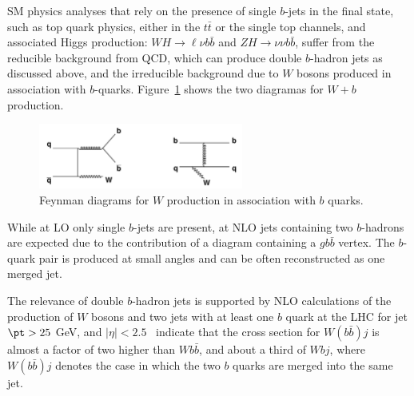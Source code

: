 SM physics analyses that rely on the presence of single $b$-jets in the final state, such as top quark physics, either in the $t\bar{t}$ or the single top channels, and associated Higgs production: $WH\rightarrow\ell\nu b\bar{b}$ and $ZH\rightarrow\nu\nu b\bar{b}$,  suffer from  %
the reducible background from QCD, which can produce double $b$-hadron jets as discussed above, and the irreducible background due to $W$ bosons produced in association with $b$-quarks.
Figure~\ref{fig:Wplusb} shows the two diagramas %
for $W+b$ production. %

\begin{figure}[htbp]
  \begin{center}
      \includegraphics[width=0.6\textwidth]{FIGS/Wbb_diagram.jpg}
    \caption{Feynman diagrams for $W$ production in association with $b$ quarks.}
    \label{fig:Wplusb}
  \end{center}
\end{figure}

While at LO only single $b$-jets are present, at NLO jets containing two $b$-hadrons are expected due to the contribution of a diagram containing a $gb\bar{b}$ vertex. The $b$-quark pair is produced at small angles and can be often reconstructed as one merged jet.




The relevance of double $b$-hadron jets is supported by NLO calculations of the production of $W$ bosons and two jets with at least one $b$ quark at the LHC for jet $\pt > 25$ GeV, and $|\eta| < 2.5$~\cite{Campbell:2006} indicate that the cross section for $W(b\bar{b})j$ is almost a factor of two higher than $Wb\bar{b}$, and about a third of $Wbj$, where  $W(b\bar{b})j$ denotes the case in which the two $b$ quarks are merged into the same jet. 


